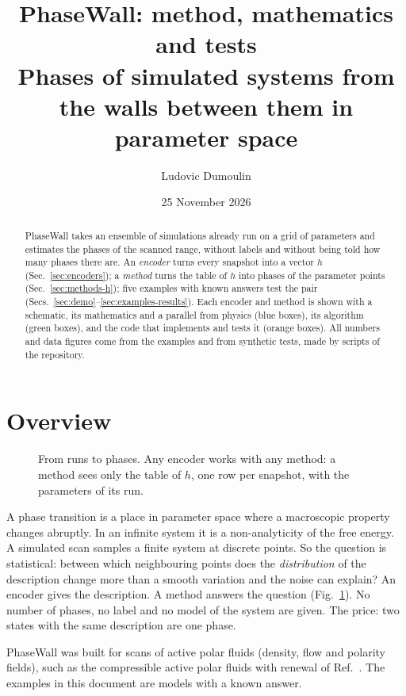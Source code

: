 \documentclass[11pt,a4paper]{article}
\title{\textbf{PhaseWall: method, mathematics and tests}\\[0.3em]
\large Phases of simulated systems from the walls between them in parameter space}
\author{Ludovic Dumoulin}
\date{25 November 2026}
\newcommand{\pw}{PhaseWall}
\begin{document}
\maketitle

\begin{abstract}
\pw{} takes an ensemble of simulations already run on a grid of parameters and estimates the
phases of the scanned range, without labels and without being told how many phases there are.
An \emph{encoder} turns every snapshot into a vector $h$ (Sec.~\ref{sec:encoders}); a
\emph{method} turns the table of $h$ into phases of the parameter points
(Sec.~\ref{sec:methods-h}); five examples with known answers test the pair
(Secs.~\ref{sec:demo}--\ref{sec:examples-results}). Each encoder and method is shown with a
schematic, its mathematics and a parallel from physics (blue boxes), its algorithm (green
boxes), and the code that implements and tests it (orange boxes). All numbers and data figures
come from the examples and from synthetic tests, made by scripts of the repository.
\end{abstract}

{\setlength{\parskip}{0pt}\tableofcontents}
\newpage

\section{Overview}\label{sec:overview}

\begin{figure}[H]
\centering

\caption{From runs to phases. Any encoder works with any method: a method sees only the table of
$h$, one row per snapshot, with the parameters of its run.}\label{fig:overview}
\end{figure}

\begin{tech}
A phase transition is a place in parameter space where a macroscopic property changes abruptly. In
an infinite system it is a non-analyticity of the free energy. A simulated scan samples a finite
system at discrete points. So the question is statistical: between which neighbouring points does the
\emph{distribution} of the description change more than a smooth variation and the noise can explain?
An encoder gives the description. A method answers the question (Fig.~\ref{fig:overview}). No number
of phases, no label and no model of the system are given. The price: two states with the same
description are one phase.

\pw{} was built for scans of active polar fluids (density, flow and polarity fields), such as the
compressible active polar fluids with renewal of Ref.~\cite{dumoulin2026}. The examples in this
document are models with a known answer.
\end{tech}
\end{document}
